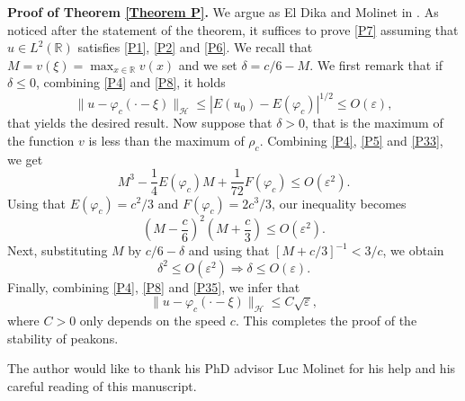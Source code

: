 \documentclass[10pt,a4paper,twoside]{article}
\begin{document}
\noindent
\textbf{Proof of Theorem \ref{Theorem P}.}
We argue as El Dika and Molinet in \cite{MR2542735}.
As noticed after the statement of the theorem, it suffices to prove \eqref{P7} assuming that $u \in L^{2}(\mathbb{R}) $ satisfies \eqref{P1}, \eqref{P2} and \eqref{P6}.  We recall that  $M=v(\xi)=\max_{x\in\mathbb{R}}v(x)$ and we set $\delta=c/6-M$. We first remark that if $\delta\le 0$, combining \eqref{P4} and \eqref{P8}, it holds
\begin{equation*}
\|u-\varphi_{c}(\cdot-\xi)\|_{\mathcal{H}}\le|E(u_{0})-E(\varphi_{c})|^{1/2}
\le O(\varepsilon),
\end{equation*}
that yields the desired result. 
Now suppose that $\delta>0$, that is the maximum of the function $v$ is less than the maximum of $\rho_{c}$. 
 Combining \eqref{P4}, \eqref{P5} and \eqref{P33}, we get
$$M^{3}-\frac{1}{4}E(\varphi_{c})M+\frac{1}{72}F(\varphi_{c})\le O(\varepsilon^{2}).$$
Using that $E(\varphi_{c})=c^{2}/3$ and $F(\varphi_{c})=2c^{3}/3$, our inequality becomes
$$\left(M-\frac{c}{6}\right)^{2}\left(M+\frac{c}{3}\right)\le  O(\varepsilon^{2}).$$
Next, substituting $M$ by $c/6-\delta$ and using that $[M+c/3]^{-1}<3/c$, we obtain
\begin{equation}
\delta^{2}\le O(\varepsilon^{2})\Rightarrow\delta\le O(\varepsilon).
\label{P35}
\end{equation}
Finally, combining \eqref{P4}, \eqref{P8} and \eqref{P35}, we infer that 
$$\|u-\varphi_{c}(\cdot-\xi)\|_{\mathcal{H}}\le C\sqrt{\varepsilon},$$
where $C>0$ only depends on the speed $c$. This completes the proof of  the stability of peakons.









\begin{Ack}
\normalfont
The author would like to thank his PhD advisor Luc Molinet for his help and his careful reading of this manuscript.
\end{Ack}










 
\end{document}

